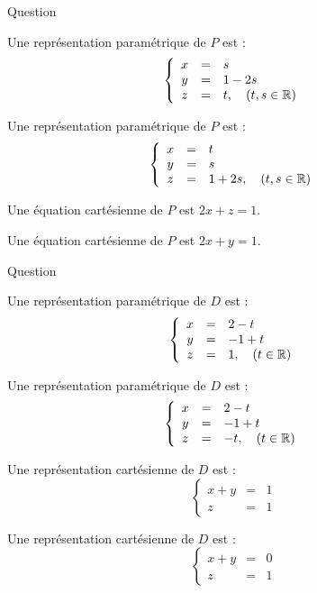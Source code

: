 \begin{multi}[multiple,feedback=
{\(P\) est le plan passant par \(A\) et dirigé par les vecteurs \(\overrightarrow{AB}\) et \(\overrightarrow{AC}\).
}]{Question}
    \item* Une représentation paramétrique de \(P\) est :
\[\left\{\begin{array}{ccl}x&=&s\\y&=&1-2s\\ z&=&t,\quad (t,s\in \mathbb{R})\end{array}\right.\]
    \item Une représentation paramétrique de \(P\) est :
\[\left\{\begin{array}{ccl}x&=&t\\y&=&s\\ z&=&1+2s,\quad (t,s\in \mathbb{R})\end{array}\right.\]
    \item Une équation cartésienne de \(P\) est \(2x+z=1\).
    \item* Une équation cartésienne de \(P\) est \(2x+y=1\).
\end{multi}


\begin{multi}[multiple,feedback=
{On peut trouver une représentation cartésienne, à partir d'une représentation   paramétrique en éliminant le paramètre.
}]{Question}
    \item* Une représentation paramétrique de \(D\) est :
\[\left\{\begin{array}{ccl}x&=&2-t\\y&=&-1+t\\ z&=&1,\quad (t\in \mathbb{R}) \end{array}\right.\]
    \item Une représentation paramétrique de \(D\) est :
\[\left\{\begin{array}{ccl}x&=&2-t\\y&=&-1+t\\ z&=&-t,\quad (t\in \mathbb{R})\end{array}\right.\]
    \item* Une représentation cartésienne de \(D\) est :
\[\left\{\begin{array}{ccl}x+y&=&1\\z&=&1 \end{array}\right.\]
    \item Une représentation cartésienne de \(D\) est :
\[\left\{\begin{array}{ccl}x+y&=&0\\z&=&1 \end{array}\right.\]
\end{multi}


